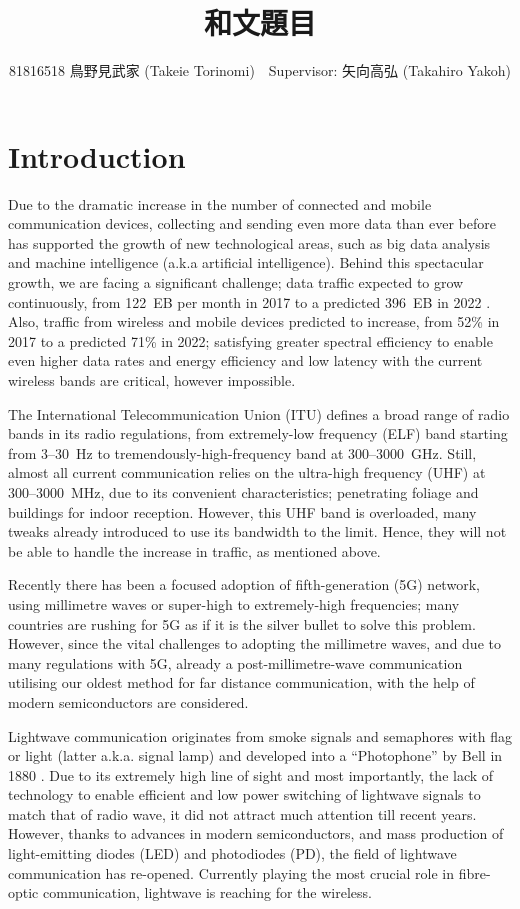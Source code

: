 ﻿\documentclass[twocolumn,9pt]{scrartcl}
\title{和文題目}
\author{81816518 鳥野見武家 (Takeie Torinomi)　Supervisor: 矢向高弘 (Takahiro Yakoh)}
\begin{document}
\maketitle
\section{Introduction}
Due to the dramatic increase in the number of connected and mobile communication devices, collecting and sending even more data than ever before has supported the growth of new technological areas, such as big data analysis and machine intelligence (a.k.a artificial intelligence).
Behind this spectacular growth, we are facing a significant challenge; data traffic expected to grow continuously, from \SI{122}{EB} per month in 2017 to a predicted \SI{396}{EB} in 2022 \cite{cisco}.
Also, traffic from wireless and mobile devices predicted to increase, from 52\% in 2017 to a predicted 71\% in 2022; satisfying greater spectral efficiency to enable even higher data rates and energy efficiency and low latency with the current wireless bands are critical, however impossible.

The International Telecommunication Union (ITU) defines a broad range of radio bands in its radio regulations,
from extremely-low frequency (ELF) band starting from 3--\SI{30}{Hz} to tremendously-high-frequency band at 300--\SI{3000}{GHz}.
Still, almost all current communication relies on the ultra-high frequency (UHF) at 300--\SI{3000}{MHz}, due to its convenient characteristics; penetrating foliage and buildings for indoor reception.
However, this UHF band is overloaded, many tweaks already introduced to use its bandwidth to the limit. 
Hence, they will not be able to handle the increase in traffic, as mentioned above.

Recently there has been a focused adoption of fifth-generation (5G) network, using millimetre waves or super-high to extremely-high frequencies; many countries are rushing for 5G as if it is the silver bullet to solve this problem.
However, since the vital challenges to adopting the millimetre waves, and due to many regulations with 5G, already a post-millimetre-wave communication utilising our oldest method for far distance communication, with the help of modern semiconductors are considered.

Lightwave communication originates from smoke signals and semaphores with flag or light (latter a.k.a. signal lamp) and developed into a ``Photophone'' by Bell in 1880 \cite{bell}.
Due to its extremely high line of sight and most importantly, the lack of technology to enable efficient and low power switching of lightwave signals to match that of radio wave, it did not attract much attention till recent years.
However, thanks to advances in modern semiconductors, and mass production of light-emitting diodes (LED) and photodiodes (PD), the field of lightwave communication has re-opened.
Currently playing the most crucial role in fibre-optic communication, lightwave is reaching for the wireless.
\end{document}
